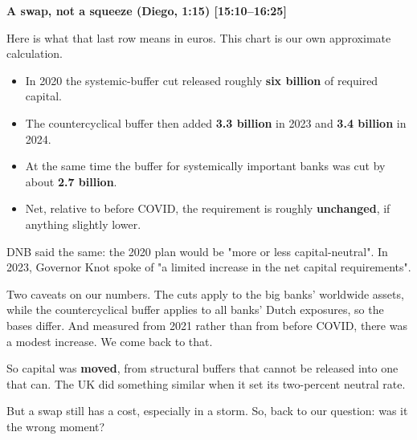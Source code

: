 {\small\textbf{A swap, not a squeeze (Diego, 1:15) [15:10–16:25]}}\par\smallskip
Here is what that last row means in euros. This chart is our own approximate calculation.
\begin{itemize}\setlength\itemsep{0pt}
\item In 2020 the systemic-buffer cut released roughly \textbf{six billion} of required capital.
\item The countercyclical buffer then added \textbf{3.3 billion} in 2023 and \textbf{3.4 billion} in 2024.
\item At the same time the buffer for systemically important banks was cut by about \textbf{2.7 billion}.
\item Net, relative to before COVID, the requirement is roughly \textbf{unchanged}, if anything slightly lower.
\end{itemize}
\par\smallskip
DNB said the same: the 2020 plan would be "more or less capital-neutral". In 2023, Governor Knot spoke of "a limited increase in the net capital requirements".
\par\smallskip
Two caveats on our numbers. The cuts apply to the big banks' worldwide assets, while the countercyclical buffer applies to all banks' Dutch exposures, so the bases differ. And measured from 2021 rather than from before COVID, there was a modest increase. We come back to that.
\par\smallskip
So capital was \textbf{moved}, from structural buffers that cannot be released into one that can. The UK did something similar when it set its two-percent neutral rate.
\par\smallskip
But a swap still has a cost, especially in a storm. So, back to our question: was it the wrong moment?

